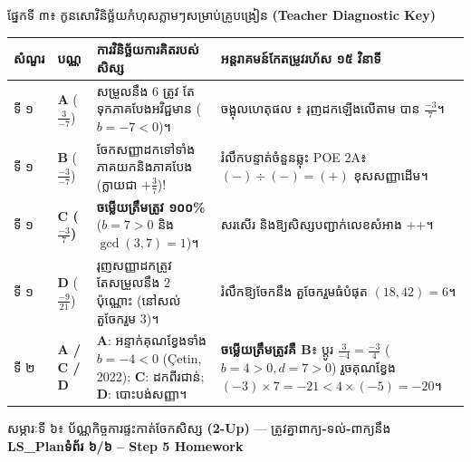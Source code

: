 \documentclass[a4paper,10pt]{article}
\newcommand{\en}[1]{{\TimesEn #1}}
\newcommand{\enbf}[1]{{\TimesEn\bfseries #1}}
\newcommand{\cnum}[1]{\mbox{\TimesEn\fontsize{10pt}{12pt}\selectfont\ding{\numexpr181+#1\relax}}}
\newcommand{\pagebanner}[2]{%
  \begin{tcolorbox}[
    enhanced, sharp corners, colback=headgray, colframe=black,
    boxrule=1.1pt, boxsep=1.5pt, top=3.5pt, bottom=3.5pt, left=6pt, right=6pt,
    after skip=5pt
  ]
    {\muol\fontsize{9.5pt}{14pt}\selectfont #1}\hfill{\fontsize{8.5pt}{12pt}\selectfont\textbf{#2}}
  \end{tcolorbox}%
}
\begin{document}
\vspace{8pt}

{\muol\fontsize{10pt}{14.5pt}\selectfont ផ្នែកទី ៣៖ កូនសោវិនិច្ឆ័យកំហុសភ្លាមៗសម្រាប់គ្រូបង្រៀន \enbf{(Teacher Diagnostic Key)}}
\vspace{3pt}

{\renewcommand{\arraystretch}{1.38}
\begin{tabular}{|C{1.65cm}|C{1.65cm}|L{6.80cm}|L{7.60cm}|}
\hline
{}
\textbf{សំណួរ} & \textbf{បណ្ណ} & \textbf{ការវិនិច្ឆ័យការគិតរបស់សិស្ស} & \textbf{អន្តរាគមន៍កែតម្រូវរហ័ស ១៥ វិនាទី} \\
\hline
ទី ១ & \enbf{A} ($\frac{3}{-7}$) & សម្រួលនឹង $6$ ត្រូវ តែទុកភាគបែងអវិជ្ជមាន ($b=-7<0$)។ & ចង្អុលហេតុផល \cnum{5}៖ រុញដកឡើងលើតាម \cnum{3} បាន $\frac{-3}{7}$។ \\
\hline
ទី ១ & \enbf{B} ($\frac{-3}{-7}$) & ចែកសញ្ញាដកទៅទាំងភាគយកនិងភាគបែង (ក្លាយជា $+\frac{3}{7}$)! & រំលឹកបន្ទាត់ចំនួនឆ្លុះ \en{POE 2A}៖ $(-)\div(-)=(+)$ ខុសសញ្ញាដើម។ \\
\hline
ទី ១ & \textbf{\enbf{C} ($\frac{-3}{7}$)} & \textbf{ចម្លើយត្រឹមត្រូវ ១០០\%} ($b=7>0$ និង $\gcd(3,7)=1$)។ & សរសើរ និងឱ្យសិស្សបញ្ជាក់លេខសំអាង \cnum{2}+\cnum{3}+\cnum{5}។ \\
\hline
ទី ១ & \enbf{D} ($\frac{-9}{21}$) & រុញសញ្ញាដកត្រូវ តែសម្រួលនឹង $2$ ប៉ុណ្ណោះ (នៅសល់តួចែករួម $3$)។ & រំលឹកឱ្យចែកនឹង $\text{តួចែករួមធំបំផុត }(18,42)=6$។ \\
\hline
ទី ២ & \enbf{A / C / D} & \enbf{A}: អន្ទាក់គុណខ្វែងទាំង $b=-4<0$ (\en{Çetin, 2022}); \enbf{C}: ដកពីរជាន់; \enbf{D}: បោះបង់សញ្ញា។ & \textbf{ចម្លើយត្រឹមត្រូវគឺ \enbf{B}}៖ ប្ដូរ $\frac{3}{-4}=\frac{-3}{4}$ ($b=4>0, d=7>0$) រួចគុណខ្វែង $(-3)\times 7 = -21 < 4\times(-5) = -20$។ \\
\hline
\end{tabular}}

\clearpage

\pagebanner{សម្ភារៈទី ៦៖ ប័ណ្ណកិច្ចការផ្ទះកាត់ចែកសិស្ស \enbf{(2-Up)} — ត្រូវគ្នាពាក្យ\enbf{-}ទល់\enbf{-}ពាក្យនឹង \enbf{LS\_Plan}}{ទំព័រ ៦/៦ \en{-- Step 5 Homework}}
\end{document}
